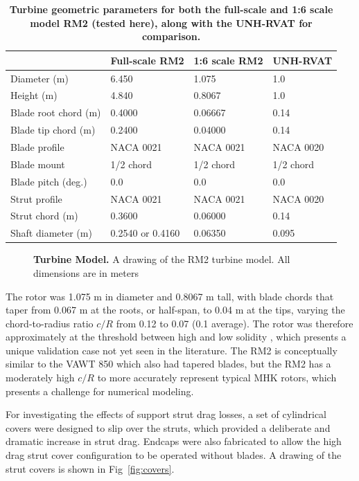\documentclass[10pt,letterpaper]{article}
\begin{document}
\begin{table}[ht]
\centering
\begin{tabular}{l|l|l|l}
   & Full-scale RM2 & 1:6 scale RM2 & UNH-RVAT \\
\hline
Diameter (m)   & 6.450 & 1.075 & 1.0 \\
Height (m)     & 4.840 & 0.8067 & 1.0 \\
Blade root chord (m) & 0.4000 & 0.06667 & 0.14 \\
Blade tip chord (m)  & 0.2400 & 0.04000 & 0.14 \\
Blade profile & NACA 0021 & NACA 0021 & NACA 0020 \\
Blade mount & 1/2 chord & 1/2 chord & 1/2 chord \\
Blade pitch (deg.) & 0.0 & 0.0 & 0.0 \\
Strut profile & NACA 0021 & NACA 0021 & NACA 0020 \\
Strut chord (m) & 0.3600 & 0.06000 & 0.14 \\
Shaft diameter (m) & 0.2540 \cite{Beam2011} or 0.4160 \cite{Hill2014} & 0.06350 & 0.095 \\
\end{tabular}
\caption{\textbf{Turbine geometric parameters for both the full-scale and 1:6
scale model RM2 (tested here), along with the UNH-RVAT for comparison.}}
\label{tab:turb-geom}
\end{table}

\begin{figure}[h]

    \caption{{\bf Turbine Model.} A drawing of the RM2 turbine model. All
    dimensions are in meters}

    \label{fig:turbine-drawing}
\end{figure}

The rotor was 1.075 m in diameter and 0.8067 m tall, with blade chords that
taper from 0.067 m at the roots, or half-span, to 0.04 m at the tips, varying
the chord-to-radius ratio $c/R$ from 0.12 to 0.07 (0.1 average). The rotor was
therefore approximately at the threshold between high and low solidity
\cite{Strickland1981,Fiedler2009}, which presents a unique validation case not
yet seen in the literature. The RM2 is conceptually similar to the VAWT 850
\cite{Mays1990} which also had tapered blades, but the RM2 has a moderately high
$c/R$ to more accurately represent typical MHK rotors, which presents a
challenge for numerical modeling.

For investigating the effects of support strut drag losses, a set of cylindrical
covers were designed to slip over the struts, which provided a deliberate and
dramatic increase in strut drag. Endcaps were also fabricated to allow the high
drag strut cover configuration to be operated without blades. A drawing of the
strut covers is shown in Fig~\ref{fig:covers}.
\end{document}
